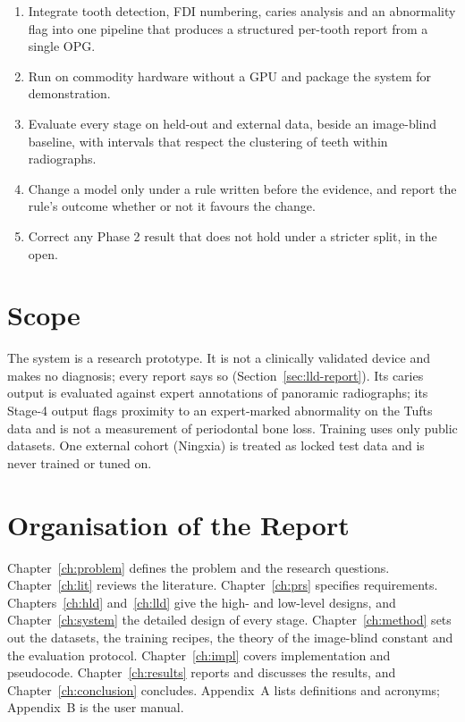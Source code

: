 \begin{enumerate}[label=O\arabic*.,leftmargin=2.2em]
\item Integrate tooth detection, FDI numbering, caries analysis and an abnormality flag into one
  pipeline that produces a structured per-tooth report from a single OPG.
\item Run on commodity hardware without a GPU and package the system for demonstration.
\item Evaluate every stage on held-out and external data, beside an image-blind baseline, with
  intervals that respect the clustering of teeth within radiographs.
\item Change a model only under a rule written before the evidence, and report the rule's outcome
  whether or not it favours the change.
\item Correct any Phase 2 result that does not hold under a stricter split, in the open.
\end{enumerate}

\section{Scope}

The system is a research prototype. It is not a clinically validated device and makes no diagnosis;
every report says so (Section~\ref{sec:lld-report}). Its caries output is evaluated against expert
annotations of panoramic radiographs; its Stage-4 output flags proximity to an expert-marked
abnormality on the Tufts data and is not a measurement of periodontal bone loss. Training uses only
public datasets. One external cohort (Ningxia) is treated as locked test data and is never trained
or tuned on.

\section{Organisation of the Report}

Chapter~\ref{ch:problem} defines the problem and the research questions. Chapter~\ref{ch:lit} reviews
the literature. Chapter~\ref{ch:prs} specifies requirements. Chapters~\ref{ch:hld}
and~\ref{ch:lld} give the high- and low-level designs, and Chapter~\ref{ch:system} the detailed
design of every stage. Chapter~\ref{ch:method} sets out the datasets, the training recipes, the theory
of the image-blind constant and the evaluation protocol. Chapter~\ref{ch:impl} covers implementation
and pseudocode. Chapter~\ref{ch:results} reports and discusses the results, and
Chapter~\ref{ch:conclusion} concludes. Appendix~A lists definitions and acronyms; Appendix~B is the
user manual.

